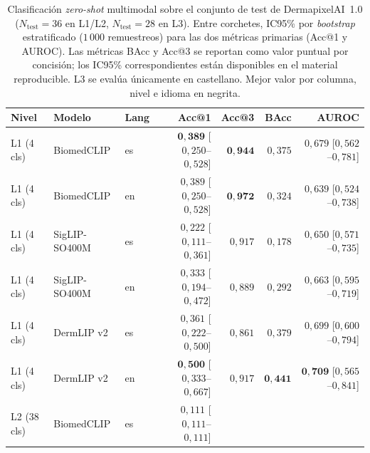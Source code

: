 \begin{table}[htbp]
\centering
\footnotesize
\setlength{\tabcolsep}{4pt}
\renewcommand{\arraystretch}{0.95}
\caption{Clasificación \emph{zero-shot} multimodal sobre el
conjunto de test de DermapixelAI~1.0 ($N_{\mathrm{test}} = 36$ en
L1/L2, $N_{\mathrm{test}} = 28$ en L3). Entre corchetes, IC95\%
por \emph{bootstrap} estratificado ($1\,000$ remuestreos) para
las dos métricas primarias (Acc@1 y AUROC). Las métricas BAcc y
Acc@3 se reportan como valor puntual por concisión; los IC95\%
correspondientes están disponibles en el material reproducible.
L3 se evalúa únicamente en castellano. Mejor valor por columna,
nivel e idioma en negrita.}
\label{tab:dermapixel-zs}
\begin{tabular}{lllrrrr}
\hline
Nivel & Modelo & Lang & Acc@1 & Acc@3 & BAcc & AUROC \\
\hline
L1 (4 cls)   & BiomedCLIP    & es & $\mathbf{0{,}389}$ [$0{,}250$--$0{,}528$]
                                  & $\mathbf{0{,}944}$
                                  & $0{,}375$
                                  & $0{,}679$ [$0{,}562$--$0{,}781$] \\
L1 (4 cls)   & BiomedCLIP    & en & $0{,}389$ [$0{,}250$--$0{,}528$]
                                  & $\mathbf{0{,}972}$
                                  & $0{,}324$
                                  & $0{,}639$ [$0{,}524$--$0{,}738$] \\
L1 (4 cls)   & SigLIP-SO400M & es & $0{,}222$ [$0{,}111$--$0{,}361$]
                                  & $0{,}917$
                                  & $0{,}178$
                                  & $0{,}650$ [$0{,}571$--$0{,}735$] \\
L1 (4 cls)   & SigLIP-SO400M & en & $0{,}333$ [$0{,}194$--$0{,}472$]
                                  & $0{,}889$
                                  & $0{,}292$
                                  & $0{,}663$ [$0{,}595$--$0{,}719$] \\
L1 (4 cls)   & DermLIP v2    & es & $0{,}361$ [$0{,}222$--$0{,}500$]
                                  & $0{,}861$
                                  & $0{,}379$
                                  & $0{,}699$ [$0{,}600$--$0{,}794$] \\
L1 (4 cls)   & DermLIP v2    & en & $\mathbf{0{,}500}$ [$0{,}333$--$0{,}667$]
                                  & $0{,}917$
                                  & $\mathbf{0{,}441}$
                                  & $\mathbf{0{,}709}$ [$0{,}565$--$0{,}841$] \\
\hline
L2 (38 cls)  & BiomedCLIP    & es & $0{,}111$ [$0{,}111$--$0{,}111$]

\end{tabular}
\end{table}
